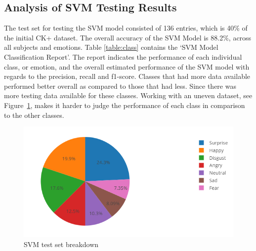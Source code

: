 \subsection{Analysis of SVM Testing Results}\label{sec:svm}
The test set for testing the SVM model consisted of 136 entries, which is 40\% of the initial CK+ dataset. The overall accuracy of the SVM Model is 88.2\%, across all subjects and emotions. Table \ref{table:class} contains the `SVM Model Classification Report'. The report indicates the performance of each individual class, or emotion, and the overall estimated performance of the SVM model with regards to the precision, recall and f1-score. Classes that had more data available performed better overall as compared to those that had less. Since there was more testing data available for these classes. Working with an uneven dataset, see Figure~\ref{fig:pie}, makes it harder to judge the performance of each class in comparison to the other classes. \\
\begin{figure}[H]
  \centering
  \includegraphics[scale=1.0]{pie}
  \caption{SVM test set breakdown}
  \label{fig:pie}
\end{figure}

